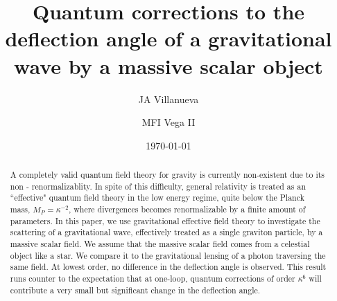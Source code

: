 \documentclass[%
 aip,
rsi,%
 amsmath,amssymb,
 reprint,%
]{revtex4-1}
\begin{document}

\title[Graviton Scattering and EFT - research notes]{Quantum corrections to the deflection angle of a gravitational wave by a massive scalar object}%

\author{JA Villanueva}
\author{MFI Vega II}%
%

\date{\today}%

\begin{abstract}
A completely valid quantum field theory for gravity is currently non-existent due to its non - renormalizablity. In spite of this difficulty, general relativity is treated as an ``effective" quantum field theory in the low energy regime, quite below the Planck mass, $M_P=\kappa^{-2}$, where divergences becomes renormalizable by a finite amount of parameters. In this paper, we use gravitational effective field theory to investigate the scattering of a gravitational wave, effectively treated as a single graviton particle, by a massive scalar field. We assume that the massive scalar field comes from a celestial object like a star. We compare it to the gravitational lensing of a photon traversing the same field. At lowest order, no difference in the deflection angle is observed. This result runs counter to the expectation that at one-loop, quantum corrections of order $\kappa^6$ will contribute a very small but significant change in the deflection angle.
\end{abstract}

\maketitle

\end{document}
